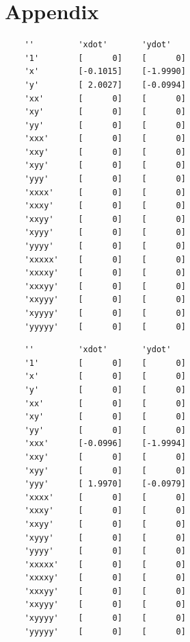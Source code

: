 \documentclass[onecolumn,11pt]{article}
\begin{document}
\newpage
\section*{Appendix}

\begin{table}[where!]
\caption{\small Damped harmonic oscillator with linear terms.}\label{Tab:Ex1_2dLin}
\begin{center}
{\footnotesize
\begin{verbatim}
    ''         'xdot'       'ydot'   
    '1'        [      0]    [      0]
    'x'        [-0.1015]    [-1.9990]
    'y'        [ 2.0027]    [-0.0994]
    'xx'       [      0]    [      0]
    'xy'       [      0]    [      0]
    'yy'       [      0]    [      0]
    'xxx'      [      0]    [      0]
    'xxy'      [      0]    [      0]
    'xyy'      [      0]    [      0]
    'yyy'      [      0]    [      0]
    'xxxx'     [      0]    [      0]
    'xxxy'     [      0]    [      0]
    'xxyy'     [      0]    [      0]
    'xyyy'     [      0]    [      0]
    'yyyy'     [      0]    [      0]
    'xxxxx'    [      0]    [      0]
    'xxxxy'    [      0]    [      0]
    'xxxyy'    [      0]    [      0]
    'xxyyy'    [      0]    [      0]
    'xyyyy'    [      0]    [      0]
    'yyyyy'    [      0]    [      0]
        \end{verbatim}
    }
    \end{center}
    \end{table}



\begin{table}[where!]
\caption{\small Damped harmonic oscillator with cubic nonlinearity.}\label{Tab:Ex1_2dCub}
\begin{center}
{\footnotesize
\begin{verbatim}
    ''         'xdot'       'ydot'   
    '1'        [      0]    [      0]
    'x'        [      0]    [      0]
    'y'        [      0]    [      0]
    'xx'       [      0]    [      0]
    'xy'       [      0]    [      0]
    'yy'       [      0]    [      0]
    'xxx'      [-0.0996]    [-1.9994]
    'xxy'      [      0]    [      0]
    'xyy'      [      0]    [      0]
    'yyy'      [ 1.9970]    [-0.0979]
    'xxxx'     [      0]    [      0]
    'xxxy'     [      0]    [      0]
    'xxyy'     [      0]    [      0]
    'xyyy'     [      0]    [      0]
    'yyyy'     [      0]    [      0]
    'xxxxx'    [      0]    [      0]
    'xxxxy'    [      0]    [      0]
    'xxxyy'    [      0]    [      0]
    'xxyyy'    [      0]    [      0]
    'xyyyy'    [      0]    [      0]
    'yyyyy'    [      0]    [      0]

    \end{verbatim}
    }
    \end{center}
    \end{table}
    
\end{document}
